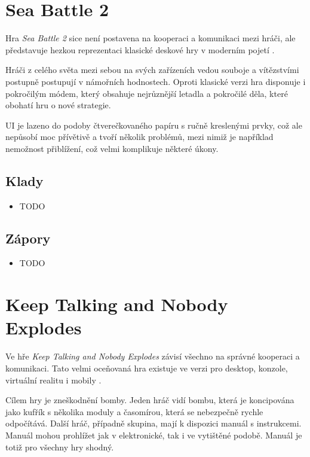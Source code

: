 \section{Sea Battle 2}

Hra \emph{Sea Battle 2} sice není postavena na kooperaci a komunikaci mezi
hráči,
ale představuje hezkou reprezentaci klasické deskové hry v moderním pojetí
\cite{henrysmithinc_spaceteam}.

Hráči z celého světa mezi sebou na svých zařízeních vedou souboje a vítězstvími
postupně postupují v námořních hodnostech.
Oproti klasické verzi hra disponuje i pokročilým módem,
který obsahuje nejrůznější letadla a pokročilé děla,
které obohatí hru o nové strategie.

UI je lazeno do podoby čtverečkovaného papíru s ručně kreslenými prvky,
což ale nepůsobí moc přívětivě a tvoří několik problémů,
mezi nimiž je například nemožnost přiblížení,
což velmi komplikuje některé úkony.

\FloatBarrier

\subsection*{Klady}

\begin{itemize}
    \item TODO
\end{itemize}

\subsection*{Zápory}

\begin{itemize}
    \item TODO
\end{itemize}

\section{Keep Talking and Nobody Explodes}

Ve hře \emph{Keep Talking and Nobody Explodes} závisí všechno na správné
kooperaci a komunikaci.
Tato velmi oceňovaná hra existuje ve verzi pro desktop, konzole,
virtuální realitu i mobily \cite{steelcrategamesinc_keep}.

Cílem hry je zneškodnění bomby.
Jeden hráč vidí bombu, která je koncipována jako kufřík s několika moduly
a časomírou, která se nebezpečně rychle odpočítává.
Další hráč, případně skupina, mají k dispozici manuál s instrukcemi.
Manuál mohou prohlížet jak v elektronické, tak i ve vytištěné podobě.
Manuál je totiž pro všechny hry shodný.


